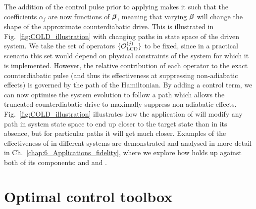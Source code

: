 The addition of the control pulse prior to applying  makes it such that the  coefficients $\alpha_j$ are now functions of $\boldsymbol{\beta}$, meaning that varying $\boldsymbol{\beta}$ will change the shape of the approximate counterdiabatic drive. This is illustrated in Fig.~\ref{fig:COLD_illustration} with changing paths in state space of the driven system. We take the set of operators $\{\mathcal{O}_{\rm LCD}^{(j)}\}$ to be fixed, since in a practical scenario this set would depend on physical constraints of the system for which it is implemented. However, the relative contribution of each operator to the exact counterdiabatic pulse (and thus its effectiveness at suppressing non-adiabatic effects) is governed by the path of the Hamiltonian. By adding a control term, we can now optimise the system evolution to follow a path which allows the truncated counterdiabatic drive to maximally suppress non-adiabatic effects. Fig.~\ref{fig:COLD_illustration} illustrates how the application of  will modify any path in system state space to end up closer to the target state than in its absence, but for particular paths it will get much closer. Examples of the effectiveness of  in different systems are demonstrated and analysed in more detail in Ch.~\ref{chap:6_Applications_fidelity}, where we explore how  holds up against both of its components:  and and .

\section{Optimal control toolbox}\label{sec:4.2_COLD_QOCT}

